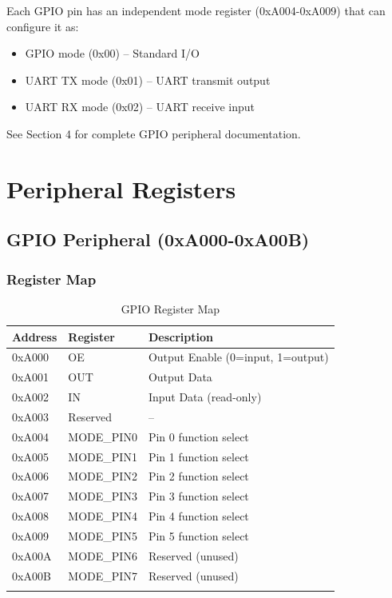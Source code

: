 \documentclass[11pt,a4paper]{article}
\begin{document}
Each GPIO pin has an independent mode register (0xA004-0xA009) that can configure it as:
\begin{itemize}
    \item GPIO mode (0x00) -- Standard I/O
    \item UART TX mode (0x01) -- UART transmit output
    \item UART RX mode (0x02) -- UART receive input
\end{itemize}

See Section 4 for complete GPIO peripheral documentation.

\section{Peripheral Registers}

\subsection{GPIO Peripheral (0xA000-0xA00B)}

\subsubsection{Register Map}

\begin{longtable}{lll}
\toprule
\textbf{Address} & \textbf{Register} & \textbf{Description} \\
\midrule
\endhead
0xA000 & OE & Output Enable (0=input, 1=output) \\
0xA001 & OUT & Output Data \\
0xA002 & IN & Input Data (read-only) \\
0xA003 & Reserved & -- \\
0xA004 & MODE\_PIN0 & Pin 0 function select \\
0xA005 & MODE\_PIN1 & Pin 1 function select \\
0xA006 & MODE\_PIN2 & Pin 2 function select \\
0xA007 & MODE\_PIN3 & Pin 3 function select \\
0xA008 & MODE\_PIN4 & Pin 4 function select \\
0xA009 & MODE\_PIN5 & Pin 5 function select \\
0xA00A & MODE\_PIN6 & Reserved (unused) \\
0xA00B & MODE\_PIN7 & Reserved (unused) \\
\bottomrule
\caption{GPIO Register Map}
\end{longtable}
\end{document}
